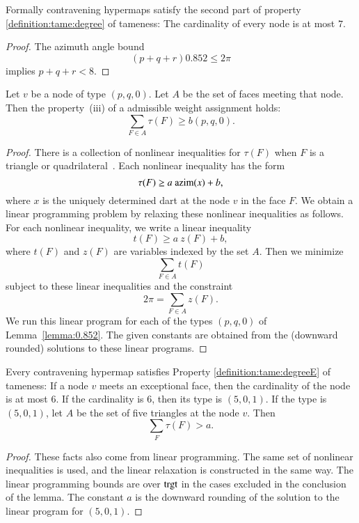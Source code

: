 \begin{lemma} 
Formally contravening hypermaps satisfy the second part of property
\ref{definition:tame:degree} of tameness: The cardinality of every
node is at most $7$.
\end{lemma}

\begin{proof}  The azimuth angle bound
$$
 (p+q+r) 0.852 \le 2\pi
$$
implies $p+q+r < 8$.
\end{proof}




\begin{lemma} Let $v$ be a node of type $(p,q,0)$.  Let $A$
be the set of faces meeting that node.  Then the property~(iii)
of a admissible weight assignment holds:
$$
\sum_{F\in A} \tau(F) \ge  b(p,q,0).
$$
\end{lemma}

\begin{proof} There is a collection of nonlinear inequalities
for $\tau(F)$ when $F$ is a triangle or quadrilateral~\cite[FUSDSPJ]{hales:2009:nonlinear}. Each nonlinear inequality has the form
$$\tau(F) \ge a~{\operatorname{azim}}(x) + b,$$
where $x$ is the uniquely determined dart at the node $v$ in the face $F$. We obtain a linear programming problem by relaxing these nonlinear inequalities as follows.  For each nonlinear inequality, we write a linear inequality
$$
t(F) \ge a~z(F) + b,
$$
where $t(F)$ and $z(F)$ are variables indexed by the set $A$.
Then we minimize 
$$\sum_{F\in A} t(F)$$
subject to these linear inequalities and the constraint
$$
2\pi = \sum_{F\in A} z(F).
$$
We run this linear program for each of the types $(p,q,0)$ of Lemma~\ref{lemma:0.852}. The given constants are obtained from the (downward rounded) solutions to these linear programs.
\end{proof}

\begin{lemma} \label{lemma:deg5}
Every contravening hypermap satisfies Property
\ref{definition:tame:degreeE} of tameness: If a node $v$ meets an
exceptional face, then the cardinality of the node is at most $6$.
If the cardinality is $6$, then its type is $(5,0,1)$.
If the type is $(5,0,1)$, let $A$ be the set of five triangles at the
node $v$.  Then
$$
\sum_F \tau(F) > a.
$$
\end{lemma}

\begin{proof} These facts also come from linear programming.
The same set of nonlinear inequalities is used, and the linear
relaxation is constructed in the same way.  The linear programming
bounds are over ${\operatorname{trgt}}$ in the cases excluded in the conclusion
of the lemma.  The constant $a$ is the downward rounding of the solution to the linear program for $(5,0,1)$.
\end{proof}

